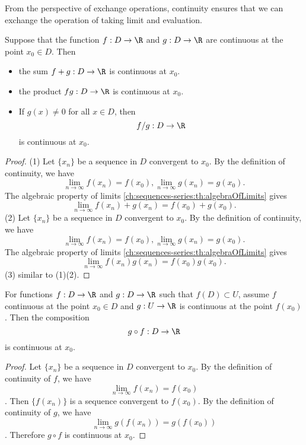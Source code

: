 \begin{refsection}
\begin{remark}
From the perspective of exchange operations, continuity ensures that we can exchange the operation of taking limit and evaluation.	
\end{remark}

\begin{lemma}\cite[55]{fitzpatrick2006advanced}
Suppose that the function $f:D\to \R$ and $g:D\to \R$ are continuous at the point $x_0\in D$. Then
\begin{itemize}
	\item the sum $f+g:D\to \R$ is continuous at $x_0$.
	\item the product $fg:D \to \R$ is continuous at $x_0$.
	\item If $g(x)\neq 0$ for all $x\in D$, then
	$$f/g:D\to\R$$
	is continuous at $x_0$.
\end{itemize}
\end{lemma}
\begin{proof}
(1) Let $\{x_n\}$ be a sequence in $D$ convergent to $x_0$. By the definition of continuity, we have
$$\lim_{n\to \infty} f(x_n) = f(x_0), \lim_{n\to \infty} g(x_n) = g(x_0).$$
The algebraic property of limits \autoref{ch:sequences-series:th:algebraOfLimits} gives
$$\lim_{n\to \infty} f(x_n) + g(x_n) = f(x_0) + g(x_0).$$
(2)	 Let $\{x_n\}$ be a sequence in $D$ convergent to $x_0$. By the definition of continuity, we have
$$\lim_{n\to \infty} f(x_n) = f(x_0), \lim_{n\to \infty} g(x_n) = g(x_0).$$
The algebraic property of limits \autoref{ch:sequences-series:th:algebraOfLimits} gives
$$\lim_{n\to \infty} f(x_n)g(x_n) = f(x_0)g(x_0).$$
(3) similar to (1)(2).
\end{proof}



\begin{lemma}
For functions $f:D\to \R$ and $g:D\to \R$ such that $f(D)\subset U$, assume $f$ continuous at the point $x_0\in D$ and $g:U\to \R$ is continuous at the point $f(x_0)$. Then the composition 
$$g\circ f: D\to \R$$
is continuous at $x_0$.
\end{lemma}
\begin{proof}
Let $\{x_n\}$ be a sequence in $D$ convergent to $x_0$. By the definition of continuity of $f$, we have
$$\lim_{n\to \infty} f(x_n) = f(x_0)$$.
Then $\{f(x_n)\}$ is a sequence convergent to $f(x_0)$. By the definition of continuity of $g$, we have
$$\lim_{n\to \infty} g(f(x_n)) = g(f(x_0))$$.
Therefore $g\circ f$ is continuous at $x_0$.
\end{proof}





\end{refsection}

